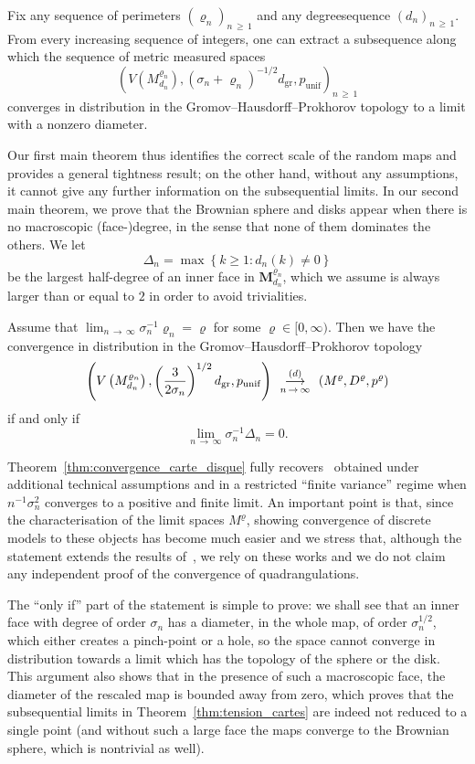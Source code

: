 \documentclass[AHL,Unicode,longabstracts,published]{cedram}
\newcommand{\1}{\ensembles{1}}
\newcommand{\Map}{\mathbf{M}}
\renewcommand{\ge}{\geqslant}
\newcommand{\Bmap}{M}
\newcommand{\dBmap}{D}
\newcommand{\pBmap}{p}
\newcommand{\Mn}{\Map_{d_n}^{\varrho_n}}
\newcommand{\mn}{M_{d_n}^{\varrho_n}}
\newcommand{\dgr}{d_{\mathrm{gr}}}
\newcommand{\pgr}{p_{\mathrm{unif}}}
\newcommand{\Vmn}{V(M_{d_n}^{\varrho_n})}
\newcommand{\cvloi}[1][n]{\enskip\mathop{\longrightarrow}^{(d)}_{#1\,\to\, \infty}\enskip}
\begin{document}
\begin{theo}\label{thm:tension_cartes}
Fix any sequence of perimeters $(\varrho_n)_{n\,\ge\,1}$ and any degree\linebreak sequence $(d_n)_{n\,\ge\,1}$. From every increasing sequence of integers, one can extract a subsequence along which the sequence of metric measured spaces
\[
\left(\Vmn, \left(\sigma_n + \varrho_n\right)^{-1/2} \dgr, \pgr\right)_{n\,\ge\,1}
\]
converges in distribution in the Gromov--Hausdorff--Prokhorov topology to a limit with a nonzero diameter.
\end{theo}



Our first main theorem thus identifies the correct scale of the random maps and provides a general tightness result; on the other hand, without any assumptions, it cannot give any further information on the subsequential limits. In our second main theorem, we prove that the Brownian sphere and disks appear when there is no macroscopic (face-)degree, in the sense that none of them dominates the others. We let
\[
\Delta_n = \max\left\{k \ge 1 : d_n(k) \ne 0\right\}
\]
be the largest half-degree of an inner face in $\Mn$, which we assume is always larger than or equal to $2$ in order to avoid trivialities.


\begin{theo}\label{thm:convergence_carte_disque}
Assume that $\lim_{n\,\to\,\infty} \sigma_n^{-1} \varrho_n = \varrho$ for some $\varrho \in [0,\infty)$. Then we have the convergence in distribution in the Gromov--Hausdorff--Prokhorov topology
\[
\left(V\left(\mn\right), \left(\frac{3}{2 \sigma_n}\right)^{1/2} \dgr, \pgr\right) \cvloi \left(\Bmap^\varrho,\dBmap^\varrho, \pBmap^\varrho\right)
\]
if and only if
\[
\lim_{n\,\to\,\infty} \sigma_n^{-1} \Delta_n = 0.
\]
\end{theo}


Theorem~\ref{thm:convergence_carte_disque} fully recovers~\cite[Theorem~1]{Mar18b} obtained under additional technical assumptions and in a restricted ``finite variance'' regime when $n^{-1} \sigma_n^2$ converges to a positive and finite limit. An important point is that, since the characterisation of the limit spaces $\Bmap^\varrho$, showing convergence of discrete models to these objects has become much easier and we stress that, although the statement extends the results of~\cite{BM17,LG13, Mie13}, we rely on these works and we do not claim any independent proof of the convergence of quadrangulations.


The ``only if'' part of the statement is simple to prove: we shall see that an inner face with degree of order $\sigma_n$ has a diameter, in the whole map, of order $\sigma_n^{1/2}$, which either creates a pinch-point or a hole, so the space cannot converge in distribution towards a limit which has the topology of the sphere or the disk. This argument also shows that in the presence of such a macroscopic face, the diameter of the rescaled map is bounded away from zero, which proves that the subsequential limits in Theorem~\ref{thm:tension_cartes} are indeed not reduced to a single point (and without such a large face the maps converge to the Brownian sphere, which is nontrivial as well).
\end{document}
